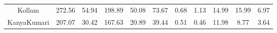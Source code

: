 \documentclass[authoryear,review,12pt]{elsarticle}
\begin{document}
\begin{table}[t]
{\begin{adjustwidth}{-0.8in}{0in}
\begin{tabular}{ccccccllccc}
	Kollam                                                                                            & 272.56                    & 54.94                      & 198.89                    & 50.08                   & 73.67                                                                                                                & 0.68                                     & 1.13                                    & 14.99                                           & 15.99                                          & 6.97               \\
	KanyaKumari                                                                                       & 207.07                    & 30.42                      & 167.63                    & 20.89                   & 39.44                                                                                                                & 0.51                                     & 0.46                                    & 11.98                                           & 8.77                                           & 3.64              
\end{tabular}
	\end{adjustwidth}
	}
	\label{mytable:b}
\end{table}
\end{document}
